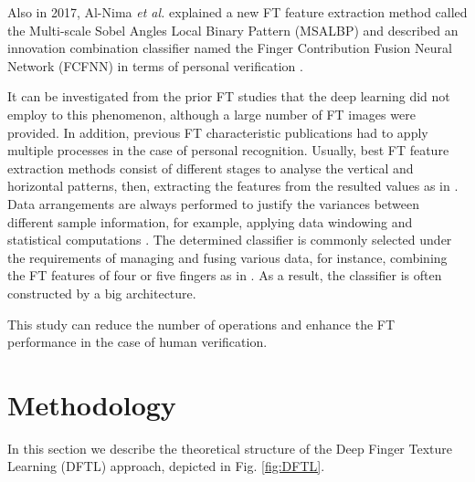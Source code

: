 \documentclass[conference]{IEEEtran}
\begin{document}
 Also in 2017, Al-Nima \textit{et al.} explained a new FT feature extraction method called the Multi-scale Sobel Angles Local Binary Pattern (MSALBP) and described an innovation combination classifier named the Finger Contribution Fusion Neural Network (FCFNN) in terms of personal verification \cite{Al-Nima2017finger}. 

It can be investigated from the prior FT studies that the deep learning did not employ to this phenomenon, although a large number of FT images were provided. In addition, previous FT characteristic publications had to apply multiple processes in the case of personal recognition. Usually, best FT feature extraction methods consist of different stages to analyse the vertical and horizontal patterns, then, extracting the features from the resulted values as in \cite{Al-Nima2017Robust} \cite{Al-Nima2017finger} \cite{Al-Nima2017efficient}. Data arrangements are always performed to justify the variances between different sample information, for example, applying data windowing and statistical computations \cite{Al-Nima2015Human} \cite{Al-Nima2016ANovel}. The determined classifier is commonly selected under the requirements of managing and fusing various data, for instance, combining the FT features of four or five fingers as in \cite{Pavesic2009Finger-based} \cite{Kanhangad2011AUnified} \cite{Al-Nima2017Robust} \cite{Al-Nima2017finger}. As a result, the classifier is often constructed by a big architecture. 

This study can reduce the number of operations and enhance the FT performance in the case of human verification. 

\section{Methodology}
In this section we describe the theoretical structure of the Deep Finger Texture Learning (DFTL) approach, depicted in Fig. \ref{fig:DFTL}.



\end{document}
